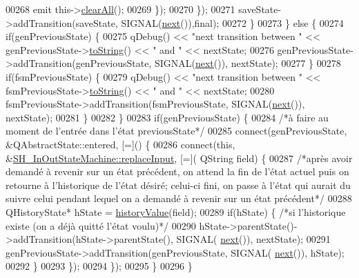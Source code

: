 \begin{DoxyCode}
00268                     emit this->\hyperlink{classSH__InOutStateMachine_ad722deb53285919796b04db5af6e51b4}{clearAll}();
00269                 \});
00270             \});
00271             saveState->addTransition(saveState, SIGNAL(\hyperlink{classSH__InOutStateMachine_aa9ee51efe0e17dcf5366c8a97b523892}{next}()),\textcolor{keyword}{final});
00272         \}
00273     \} \textcolor{keywordflow}{else} \{
00274         \textcolor{keywordflow}{if}(genPreviousState) \{
00275             qDebug() << \textcolor{stringliteral}{"next transition between "} << genPreviousState->\hyperlink{classSH__GenericState_a5480c5ee725fd801d8f6292cd4c803b8}{toString}() << \textcolor{stringliteral}{" and "} << 
      nextState;
00276             genPreviousState->addTransition(genPreviousState, SIGNAL(\hyperlink{classSH__InOutStateMachine_aa9ee51efe0e17dcf5366c8a97b523892}{next}()), nextState);
00277         \}
00278         \textcolor{keywordflow}{if}(fsmPreviousState) \{
00279             qDebug() << \textcolor{stringliteral}{"next transition between "} << fsmPreviousState->\hyperlink{classSH__InOutStateMachine_a60ecd7de03d948e2d1e9cbedb5c3e5fa}{toString}() << \textcolor{stringliteral}{" and "} << 
      nextState;
00280             fsmPreviousState->addTransition(fsmPreviousState, SIGNAL(\hyperlink{classSH__InOutStateMachine_aa9ee51efe0e17dcf5366c8a97b523892}{next}()), nextState);
00281         \}
00282     \}
00283     \textcolor{keywordflow}{if}(genPreviousState) \{
00284         \textcolor{comment}{/*à faire au moment de l'entrée dans l'état previousState*/}
00285         connect(genPreviousState, &QAbstractState::entered, [=]() \{
00286             connect(\textcolor{keyword}{this}, &\hyperlink{classSH__InOutStateMachine_af5f82970faef3bca48a147863dba2ee1}{SH\_InOutStateMachine::replaceInput}, [=](
      QString field) \{
00287                 \textcolor{comment}{/*après avoir demandé à revenir sur un état précédent, on attend la fin de l'état actuel
       puis on retourne à l'historique de l'état désiré; celui-ci fini, on passe à l'état qui aurait du suivre celui
       pendant lequel on a demandé à revenir sur un état précédent*/}
00288                 QHistoryState* hState = \hyperlink{classSH__InOutStateMachine_a84fb2b2c2105cae9c590c0d15960854a}{historyValue}(field);
00289                 \textcolor{keywordflow}{if}(hState) \{ \textcolor{comment}{/*si l'historique existe (on a déjà quitté l'état voulu)*/}
00290                     hState->parentState()->addTransition(hState->parentState(), SIGNAL(
      \hyperlink{classSH__InOutStateMachine_aa9ee51efe0e17dcf5366c8a97b523892}{next}()), nextState);
00291                     genPreviousState->addTransition(genPreviousState, SIGNAL(
      \hyperlink{classSH__InOutStateMachine_aa9ee51efe0e17dcf5366c8a97b523892}{next}()), hState);
00292                 \}
00293             \});
00294         \});
00295     \}
00296 \}
\end{DoxyCode}


